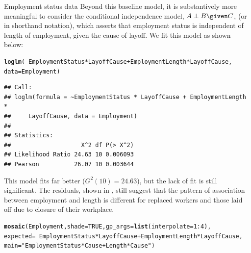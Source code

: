 \documentclass[11pt]{book}\usepackage[]{graphicx}\usepackage[]{color}
\makeatletter
\newcommand{\hlnum}[1]{\textcolor[rgb]{0.686,0.059,0.569}{#1}}%
\newcommand{\hlstr}[1]{\textcolor[rgb]{0.192,0.494,0.8}{#1}}%
\newcommand{\hlopt}[1]{\textcolor[rgb]{0,0,0}{#1}}%
\newcommand{\hlstd}[1]{\textcolor[rgb]{0.345,0.345,0.345}{#1}}%
\newcommand{\hlkwc}[1]{\textcolor[rgb]{0.333,0.667,0.333}{#1}}%
\newcommand{\hlkwd}[1]{\textcolor[rgb]{0.737,0.353,0.396}{\textbf{#1}}}%
\newenvironment{kframe}{%
 \def\at@end@of@kframe{}%
 \ifinner\ifhmode%
  \def\at@end@of@kframe{\end{minipage}}%
  \begin{minipage}{\columnwidth}%
 \fi\fi%
 \def\FrameCommand##1{\hskip\@totalleftmargin \hskip-\fboxsep
 \colorbox{shadecolor}{##1}\hskip-\fboxsep
     \hskip-\linewidth \hskip-\@totalleftmargin \hskip\columnwidth}%
 \MakeFramed {\advance\hsize-\width
   \@totalleftmargin\z@ \linewidth\hsize
   \@setminipage}}%
 {\par\unskip\endMakeFramed%
 \at@end@of@kframe}
\newenvironment{knitrout}{}{} %
\renewenvironment{knitrout}{\small\renewcommand{\baselinestretch}{.85}}{} %
\makeatother
\begin{document}
\begin{Example}[employ]{Employment status data}
Beyond this baseline model, it is substantively more meaningful to consider the 
conditional independence model, \(A \perp B \given C\),
(or  in shorthand notation), which asserts that
employment status is independent of length of employment, given the cause of layoff.
We fit this model as shown below:
\begin{knitrout}
\color{fgcolor}\begin{kframe}
\begin{alltt}
\hlkwd{loglm}\hlstd{(}\hlopt{~} \hlstd{EmploymentStatus}\hlopt{*}\hlstd{LayoffCause} \hlopt{+} \hlstd{EmploymentLength}\hlopt{*}\hlstd{LayoffCause,}
      \hlkwc{data}\hlstd{=Employment)}
\end{alltt}
\begin{verbatim}
## Call:
## loglm(formula = ~EmploymentStatus * LayoffCause + EmploymentLength * 
##     LayoffCause, data = Employment)
## 
## Statistics:
##                    X^2 df P(> X^2)
## Likelihood Ratio 24.63 10 0.006093
## Pearson          26.07 10 0.003644
\end{verbatim}
\end{kframe}
\end{knitrout}

This model fits far better (\(G^2 (10) = 24.63\)),
but the lack of fit is still significant.
The residuals, shown in , still
suggest that the pattern of association between employment and length
is different for replaced workers and those laid off due to closure of their workplace.

\begin{knitrout}
\color{fgcolor}\begin{kframe}
\begin{alltt}
\hlkwd{mosaic}\hlstd{(Employment,} \hlkwc{shade}\hlstd{=}\hlnum{TRUE}\hlstd{,} \hlkwc{gp_args}\hlstd{=}\hlkwd{list}\hlstd{(}\hlkwc{interpolate}\hlstd{=}\hlnum{1}\hlopt{:}\hlnum{4}\hlstd{),}
       \hlkwc{expected} \hlstd{=} \hlopt{~} \hlstd{EmploymentStatus}\hlopt{*}\hlstd{LayoffCause} \hlopt{+} \hlstd{EmploymentLength}\hlopt{*}\hlstd{LayoffCause,}
       \hlkwc{main} \hlstd{=} \hlstr{"EmploymentStatus * Cause + Length * Cause"}\hlstd{)}
\end{alltt}
\end{kframe}\begin{figure}[htbp]



\end{figure}
\end{knitrout}
\end{Example}
\end{document}
